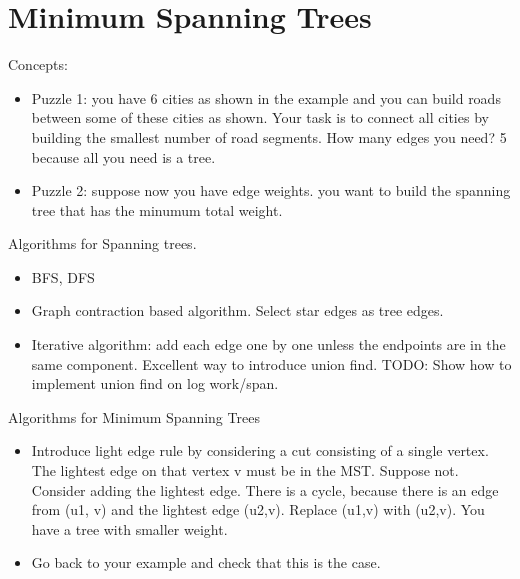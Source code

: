 \chapter{Minimum Spanning Trees}
\newcommand{\boruvka}{Bor\r{u}vka\xspace}
\label{ch:mst}

\begin{notesonly}

Concepts:

\begin{itemize}

\item Puzzle 1: you have 6 cities as shown in the example and you can
  build roads between some of these cities as shown. Your task is to
  connect all cities by building the smallest number of road segments.
  How many edges you need?  5 because all you need is a tree.

\item Puzzle 2: suppose now you have edge weights.  you want to build
  the spanning tree that has the minumum total weight.
\end{itemize}


Algorithms for Spanning trees.
\begin{itemize}

\item BFS, DFS


\item Graph contraction based algorithm. Select star edges as tree edges.

\item Iterative algorithm: add each edge one by one unless the
  endpoints are in the same component.  Excellent way to introduce
  union find. TODO: Show how to implement union find on log work/span.

\end{itemize}



Algorithms for  Minimum Spanning Trees
\begin{itemize}

\item Introduce light edge rule by considering a cut consisting of a
  single vertex.  The lightest edge on that vertex v must be in the
  MST.  Suppose not.  Consider adding the lightest edge.  There is a
  cycle, because there is an edge from (u1, v) and the lightest edge
  (u2,v).  Replace (u1,v) with (u2,v).  You have  a tree with smaller
  weight.

\item Go back to your example and check that this is the case.


\end{itemize}
\end{notesonly}
